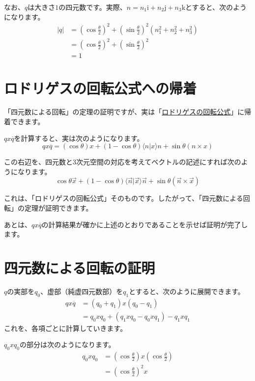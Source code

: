 \documentclass{jlreq}
\numberwithin{equation}{section}
\newcommand{\ii}{\mathrm{i}}
\newcommand{\jj}{\mathrm{j}}
\newcommand{\kk}{\mathrm{k}}
\begin{document}
なお、$q$は大きさ$1$の四元数です。実際、$n=n_1\ii+n_2\jj+n_3\kk$とすると、次のようになります。
\begin{align}
    |q| & =\left(\cos\frac{\theta}{2}\right)^2+\left(\sin\frac{\theta}{2}\right)^2(n_1^2+n_2^2+n_3^2) \\
        & =\left(\cos\frac{\theta}{2}\right)^2+\left(\sin\frac{\theta}{2}\right)^2                    \\
        & =1
\end{align}

\section{ロドリゲスの回転公式への帰着}

「四元数による回転」の定理の証明ですが、実は「\href{https://mathlog.info/articles/3190}{ロドリゲスの回転公式}」に帰着できます。

$qx\overline{q}$を計算すると、実は次のようになります。
\begin{equation}
    qx\overline{q}=(\cos\theta)x+(1-\cos\theta)\langle n|x\rangle n+\sin\theta(n\times x)
\end{equation}

この右辺を、四元数と3次元空間の対応を考えてベクトルの記述にすれば次のようになります。
\begin{equation}
    \cos\theta\vec{x}+(1-\cos\theta)\langle\vec{n}|\vec{x}\rangle\vec{n}+\sin\theta(\vec{n}\times\vec{x})
\end{equation}

これは、「ロドリゲスの回転公式」そのものです。したがって、「四元数による回転」の定理が証明できます。

あとは、$qx\overline{q}$の計算結果が確かに上述のとおりであることを示せば証明が完了します。

\section{四元数による回転の証明}

$q$の実部を$q_0$、虚部（純虚四元数部）を$q_1$とすると、次のように展開できます。
\begin{align}
    qx\overline{q} & =(q_0+q_1)x(q_0-q_1)               \\
                   & =q_0xq_0+(q_1xq_0-q_0xq_1)-q_1xq_1
\end{align}
これを、各項ごとに計算していきます。

$q_0xq_0$の部分は次のようになります。
\begin{align}
    q_0xq_0 & =\left(\cos\frac{\theta}{2}\right)x\left(\cos\frac{\theta}{2}\right) \\
            & =\left(\cos\frac{\theta}{2}\right)^2x
\end{align}
\end{document}
